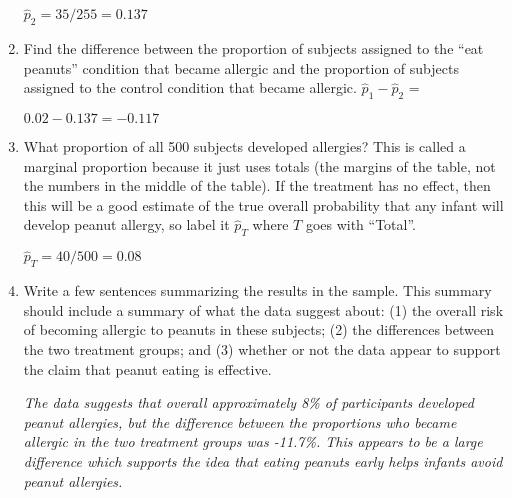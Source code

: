 \begin{enumerate}
\begin{key}
  {\it  $\widehat{p}_2 = 35/255 = 0.137$}
\end{key}



   \item Find the difference between the proportion of subjects
     assigned to the ``eat peanuts'' condition that became allergic and the
     proportion of subjects assigned to the control condition that
     became allergic.  $\widehat{p}_1 - \widehat{p}_2$ = 
\begin{students}
\vspace{2cm}
\end{students}

\begin{key}
  {\it  $0.02 - 0.137 = -0.117$}
\end{key}

   \item What proportion of all 500 subjects developed allergies?  This is called
     a marginal proportion because it just uses totals (the margins of
     the table, not the numbers in the middle of the table).  If the
     treatment has no effect, then this will be a good estimate of the
     true overall probability that any infant will develop peanut
     allergy, so label it $\widehat{p}_T$ where $T$ goes with ``Total''.
\begin{students}
\vspace{2cm}
\end{students}

\begin{key}
  {\it $\widehat{p}_T = 40/500 = 0.08$ }
\end{key}


   \item  Write a few sentences summarizing the results in the
     sample. This summary should include a summary of what the data
     suggest about: (1) the overall risk of becoming allergic to
     peanuts in these  subjects; (2) the differences between the two
     treatment groups; 
     and (3) whether or not the data appear to support the claim that
     peanut eating is effective. 
\begin{students}
\vspace{4cm}
\end{students}

\begin{key}
  {\it       The data suggests that overall approximately 8\% of
     participants developed peanut allergies, but the difference
     between the proportions who became allergic in the two treatment
     groups  was -11.7\%.  This appears to be a large difference which
     supports the idea that eating peanuts early helps infants avoid
     peanut allergies.}
\end{key}

   \end{enumerate}
   
